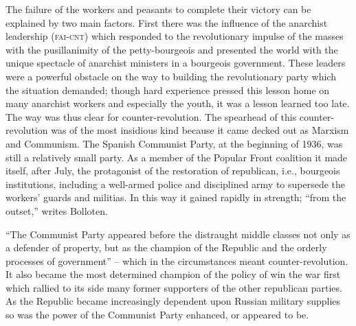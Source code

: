 \indexCNT\indexPCE{}
The failure of the workers and peasants to complete their victory can be explained by two main factors. First there was the influence of the anarchist leadership (\textsc{fai-cnt}) which responded to the revolutionary impulse of the masses with the pusillanimity of the petty-bourgeois and presented the world with the unique spectacle of anarchist ministers in a bourgeois government. These leaders were a powerful obstacle on the way to building the revolutionary party which the situation demanded; though hard experience pressed this lesson home on many anarchist workers and especially the youth, it was a lesson learned too late. The way was thus clear for  counter-revolution. The spearhead of this counter-revolution was of the most insidious kind because it came decked out as Marxism and Communism. The Spanish Communist Party, at the beginning of 1936, was still a relatively small party. As a member of the Popular Front coalition it made itself, after July, the protagonist of the restoration of republican, i.e., bourgeois institutions, including a well-armed police and disciplined army to supersede the workers’ guards and militias. In this way it gained rapidly in strength; ``from the outset,'' writes Bolloten.

\indexPCE{}
``The Communist Party appeared before the distraught middle classes not only as a defender of property, but as the champion of the Republic and the orderly processes of government'' -- which in the circumstances meant  counter-revolution. It also became the most determined champion of the policy of win the war first which rallied to its side many former supporters of the other republican parties. As the Republic became increasingly dependent upon Russian military supplies so was the power of the Communist Party enhanced, or appeared to be.

